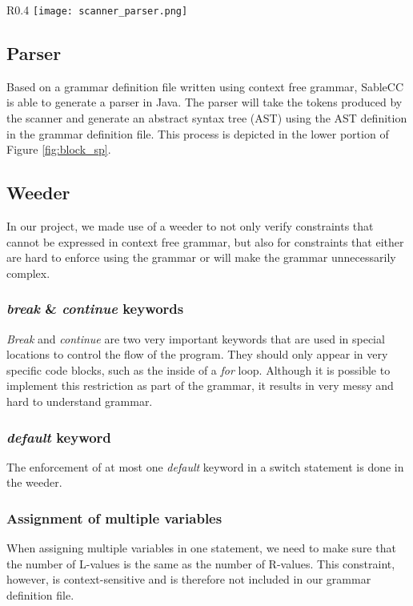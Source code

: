 \documentclass[a4paper]{article}
\begin{document}
\begin{wrapfigure}{R}{0.4\textwidth}
\centering
\texttt{[image: scanner\_parser.png]}
\caption{\label{fig:block_sp}Structure of scanner and parser, both written in SableCC.}
\end{wrapfigure}


\subsection{Parser}
Based on a grammar definition file written using context free grammar, SableCC is able to generate a parser in Java. The parser will take the tokens produced by the scanner and generate an abstract syntax tree (AST) using the AST definition in the grammar definition file. This process is depicted in the lower portion of Figure \ref{fig:block_sp}. 

\subsection{Weeder}
In our project, we made use of a weeder to not only verify constraints that cannot be expressed in context free grammar, but also for constraints that either are hard to enforce using the grammar or will make the grammar unnecessarily complex.

\subsubsection{\textit{break} \& \textit{continue} keywords}
\textit{Break} and \textit{continue} are two very important keywords that are used in special locations to control the flow of the program. They should only appear in very specific code blocks, such as the inside of a \textit{for} loop. Although it is possible to implement this restriction as part of the grammar, it results in very messy and hard to understand grammar. 

\subsubsection{\textit{default} keyword}
The enforcement of at most one \textit{default} keyword in a switch statement is done in the weeder. 

\subsubsection{Assignment of multiple variables}
When assigning multiple variables in one statement, we need to make sure that the number of L-values is the same as the number of R-values. This constraint, however, is context-sensitive and is therefore not included in our grammar definition file. 
\end{document}
